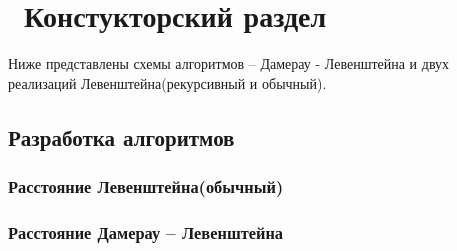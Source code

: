 \chapter{ Констукторский раздел}
\label{cha:design}

Ниже представлены схемы алгоритмов -- Дамерау - Левенштейна и двух реализаций Левенштейна(рекурсивный и обычный).

\section{ Разработка алгоритмов}
\subsection{ Расстояние Левенштейна(обычный)}

\begin{figure}[ht!]
\end{figure}

\subsection{ Расстояние Дамерау -- Левенштейна}

\begin{figure}[ht!]
\end{figure}
